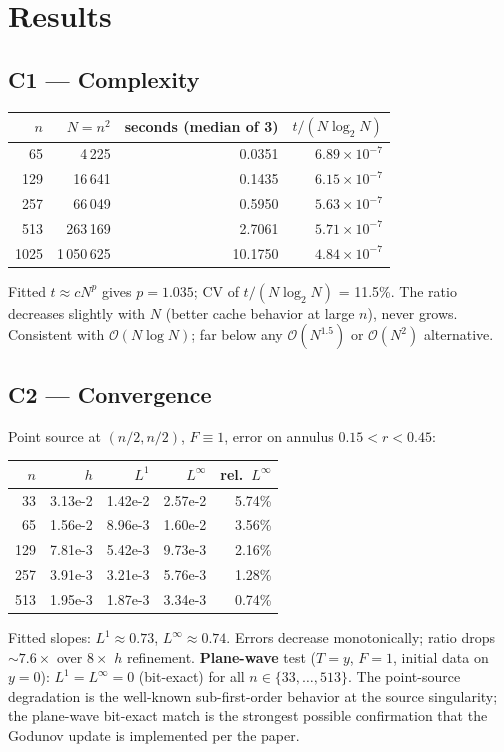 \documentclass[11pt]{article}
\begin{document}
\section{Results}
\subsection{C1 --- Complexity}
\begin{center}
\begin{tabular}{rrrr}
\toprule
$n$ & $N=n^2$ & seconds (median of 3) & $t/(N\log_2 N)$ \\ \midrule
  65 &      4\,225 &  0.0351 & $6.89\times10^{-7}$ \\
 129 &     16\,641 &  0.1435 & $6.15\times10^{-7}$ \\
 257 &     66\,049 &  0.5950 & $5.63\times10^{-7}$ \\
 513 &    263\,169 &  2.7061 & $5.71\times10^{-7}$ \\
1025 & 1\,050\,625 & 10.1750 & $4.84\times10^{-7}$ \\
\bottomrule
\end{tabular}
\end{center}
Fitted $t\approx cN^p$ gives $p=1.035$; CV of $t/(N\log_2 N)$ = 11.5\%.
The ratio decreases slightly with $N$ (better cache behavior at large $n$),
never grows. Consistent with $\mathcal{O}(N\log N)$; far below any
$\mathcal{O}(N^{1.5})$ or $\mathcal{O}(N^2)$ alternative.

\subsection{C2 --- Convergence}
Point source at $(n/2,n/2)$, $F\equiv1$, error on annulus $0.15<r<0.45$:
\begin{center}
\begin{tabular}{rrrrr}
\toprule
$n$ & $h$ & $L^1$ & $L^\infty$ & rel.\ $L^\infty$ \\ \midrule
 33 & 3.13e-2 & 1.42e-2 & 2.57e-2 & 5.74\% \\
 65 & 1.56e-2 & 8.96e-3 & 1.60e-2 & 3.56\% \\
129 & 7.81e-3 & 5.42e-3 & 9.73e-3 & 2.16\% \\
257 & 3.91e-3 & 3.21e-3 & 5.76e-3 & 1.28\% \\
513 & 1.95e-3 & 1.87e-3 & 3.34e-3 & 0.74\% \\
\bottomrule
\end{tabular}
\end{center}
Fitted slopes: $L^1\approx0.73$, $L^\infty\approx0.74$. Errors decrease
monotonically; ratio drops $\sim 7.6\times$ over $8\times$ $h$ refinement.
\textbf{Plane-wave} test ($T=y$, $F=1$, initial data on $y=0$): $L^1=L^\infty=0$
(bit-exact) for all $n\in\{33,\dots,513\}$. The point-source degradation is
the well-known sub-first-order behavior at the source singularity; the
plane-wave bit-exact match is the strongest possible confirmation that the
Godunov update is implemented per the paper.
\end{document}

